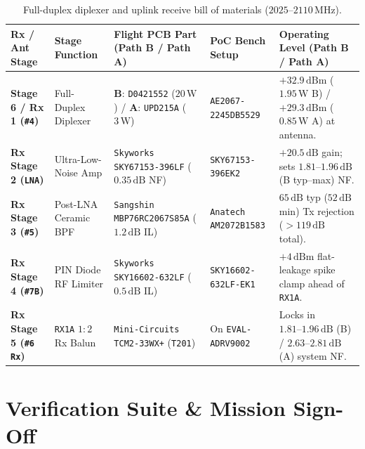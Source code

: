 \documentclass[10pt,a4paper]{article}
\renewcommand{\_}{\origunderscore\penalty0\hskip0pt\relax}
\numberwithin{table}{section}
\numberwithin{figure}{section}
\numberwithin{equation}{section}
\begin{document}
\begin{table}[htbp]
\centering
\scriptsize
\renewcommand{\arraystretch}{1.12}
\begin{tabularx}{\textwidth}{@{}L{0.92in}L{1.38in}L{1.72in}L{1.18in}Y@{}}
\toprule
\textbf{Rx / Ant Stage} & \textbf{Stage Function} & \textbf{Flight PCB Part (Path B / Path A)} & \textbf{PoC Bench Setup} & \textbf{Operating Level (Path B / Path A)} \\
\midrule
\textbf{Stage 6 / Rx 1 (\texttt{\#4})} & Full-Duplex Diplexer & \textbf{B}: \texttt{D0421552} ($20\,\text{W}$) / \textbf{A}: \texttt{UPD215A} ($3\,\text{W}$) & \texttt{AE2067-2245DB5529} & $+32.9\,\text{dBm}$ ($1.95\,\text{W}$ B) / $+29.3\,\text{dBm}$ ($0.85\,\text{W}$ A) at antenna. \\
\textbf{Rx Stage 2 (\texttt{LNA})} & Ultra-Low-Noise Amp & \texttt{Skyworks SKY67153-396LF} ($0.35\,\text{dB}$ NF) & \texttt{SKY67153-396EK2} & $+20.5\,\text{dB}$ gain; sets $1.81\text{--}1.96\,\text{dB}$ (B typ--max) NF. \\
\textbf{Rx Stage 3 (\texttt{\#5})} & Post-LNA Ceramic BPF & \texttt{Sangshin MBP76RC2067S85A} ($1.2\,\text{dB}$ IL) & \texttt{Anatech AM2072B1583} & $65\,\text{dB}$ typ ($52\,\text{dB}$ min) Tx rejection ($>119\,\text{dB}$ total). \\
\textbf{Rx Stage 4 (\texttt{\#7B})} & PIN Diode RF Limiter & \texttt{Skyworks SKY16602-632LF} ($0.5\,\text{dB}$ IL) & \texttt{SKY16602-632LF-EK1} & $+4\,\text{dBm}$ flat-leakage spike clamp ahead of \texttt{RX1A}. \\
\textbf{Rx Stage 5 (\texttt{\#6 Rx})} & \texttt{RX1A} $1:2$ Rx Balun & \texttt{Mini-Circuits TCM2-33WX+} (\texttt{T201}) & On \texttt{EVAL-ADRV9002} & Locks in $1.81\text{--}1.96\,\text{dB}$ (B) / $2.63\text{--}2.81\,\text{dB}$ (A) system NF. \\
\bottomrule
\end{tabularx}
\caption{\footnotesize Full-duplex diplexer and uplink receive bill of materials ($2025\text{--}2110\,\text{MHz}$).}
\end{table}

\vspace{4pt}
\section{Verification Suite \& Mission Sign-Off}
\end{document}

